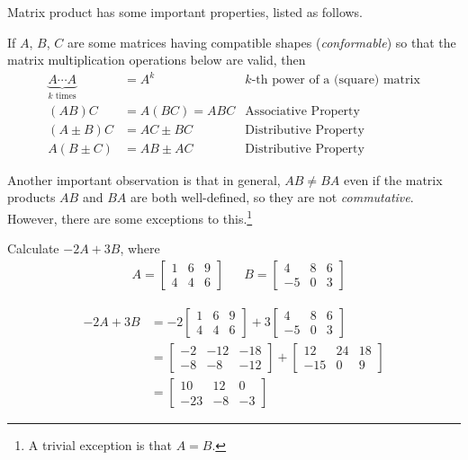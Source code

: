 Matrix product has some important properties, listed as follows.
\begin{proper}
\label{proper:matmul}
If $A$, $B$, $C$ are some matrices having compatible shapes (\textit{conformable}) so that the matrix multiplication operations below are valid, then
\begin{align*}
\underbrace{A\cdots A}_{k \text{ times}} &= A^k &\text{$k$-th power of a (square) matrix} \\
(AB)C &= A(BC) = ABC &\text{Associative Property} \\
(A \pm B)C &= AC \pm BC &\text{Distributive Property} \\
A(B \pm C) &= AB \pm AC &\text{Distributive Property}
\end{align*}
\end{proper}
Another important observation is that in general, $AB \neq BA$ even if the matrix products $AB$ and $BA$ are both well-defined, so they are not \textit{commutative}. However, there are some exceptions to this.\footnote{A trivial exception is that $A=B$.}
\begin{exmp}
Calculate $-2A + 3B$, where
\begin{align*}
& A = 
\begin{bmatrix}
1 & 6 & 9 \\
4 & 4 & 6 
\end{bmatrix} &
& B = 
\begin{bmatrix}
4 & 8 & 6 \\
-5 & 0 & 3
\end{bmatrix}
\end{align*}
\end{exmp}
\begin{solution}
\begin{align*}
-2A + 3B &= 
-2\begin{bmatrix}
1 & 6 & 9 \\
4 & 4 & 6 
\end{bmatrix}
+3\begin{bmatrix}
4 & 8 & 6 \\
-5 & 0 & 3
\end{bmatrix} \\
&= \begin{bmatrix}
-2 & -12 & -18 \\
-8 & -8 & -12 
\end{bmatrix}
+ \begin{bmatrix}
12 & 24 & 18 \\
-15 & 0 & 9
\end{bmatrix} \\
&= \begin{bmatrix}
10 & 12 & 0 \\
-23 & -8 & -3
\end{bmatrix}
\end{align*}
\end{solution}

